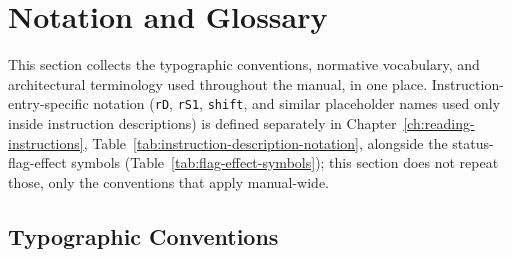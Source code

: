 \chapter*{Notation and Glossary}
\label{ch:notation-glossary}

This section collects the typographic conventions, normative vocabulary, and architectural terminology used throughout
the manual, in one place. Instruction-entry-specific notation (\texttt{rD}, \texttt{rS1}, \texttt{shift}, and similar
placeholder names used only inside instruction descriptions) is defined separately in
Chapter~\ref{ch:reading-instructions}, Table~\ref{tab:instruction-description-notation}, alongside the
status-flag-effect symbols (Table~\ref{tab:flag-effect-symbols}); this section does not repeat those, only the
conventions that apply manual-wide.

\section*{Typographic Conventions}

